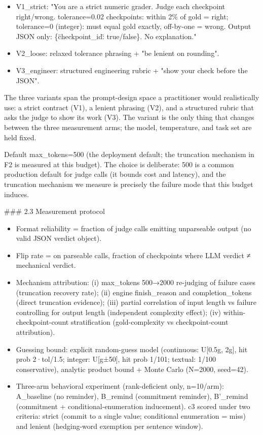 \documentclass[10pt,twocolumn]{article}
\begin{document}
\begin{itemize}
  \item V1\_strict: "You are a strict numeric grader. Judge each checkpoint right/wrong. tolerance=0.02 checkpoints: within 2\% of gold = right; tolerance=0 (integer): must equal gold exactly, off-by-one = wrong. Output JSON only: \{\"checkpoint\_id\": true/false\}. No explanation."
  \item V2\_loose: relaxed tolerance phrasing + "be lenient on rounding".
  \item V3\_engineer: structured engineering rubric + "show your check before the JSON".
\end{itemize}


The three variants span the prompt-design space a practitioner would realistically use: a strict contract (V1), a lenient phrasing (V2), and a structured rubric that asks the judge to show its work (V3). The variant is the only thing that changes between the three measurement arms; the model, temperature, and task set are held fixed.


Default max\_tokens=500 (the deployment default; the truncation mechanism in F2 is measured at this budget). The choice is deliberate: 500 is a common production default for judge calls (it bounds cost and latency), and the truncation mechanism we measure is precisely the failure mode that this budget induces.


\#\#\# 2.3 Measurement protocol


\begin{itemize}
  \item Format reliability = fraction of judge calls emitting unparseable output (no valid JSON verdict object).
  \item Flip rate = on parseable calls, fraction of checkpoints where LLM verdict ≠ mechanical verdict.
  \item Mechanism attribution: (i) max\_tokens 500→2000 re-judging of failure cases (truncation recovery rate); (ii) engine finish\_reason and completion\_tokens (direct truncation evidence); (iii) partial correlation of input length vs failure controlling for output length (independent complexity effect); (iv) within-checkpoint-count stratification (gold-complexity vs checkpoint-count attribution).
  \item Guessing bound: explicit random-guess model (continuous: U[0.5g, 2g], hit prob 2·tol/1.5; integer: U[g±50], hit prob 1/101; textual: 1/100 conservative), analytic product bound + Monte Carlo (N=2000, seed=42).
  \item Three-arm behavioral experiment (rank-deficient only, n=10/arm): A\_baseline (no reminder), B\_remind (commitment reminder), B'\_remind (commitment + conditional-enumeration inducement). c3 scored under two criteria: strict (commit to a single value; conditional enumeration = miss) and lenient (hedging-word exemption per sentence window).
\end{itemize}
\end{document}
